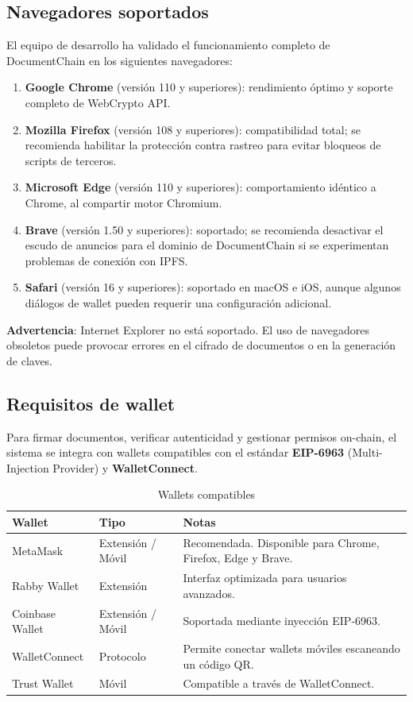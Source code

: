 \documentclass[11pt, a4paper]{article}
\begin{document}
\subsection{Navegadores soportados}

El equipo de desarrollo ha validado el funcionamiento completo de DocumentChain en los siguientes navegadores:

\begin{enumerate}
    \item \textbf{Google Chrome} (versi\'{o}n 110 y superiores): rendimiento \'{o}ptimo y soporte completo de WebCrypto API.
    \item \textbf{Mozilla Firefox} (versi\'{o}n 108 y superiores): compatibilidad total; se recomienda habilitar la protecci\'{o}n contra rastreo para evitar bloqueos de scripts de terceros.
    \item \textbf{Microsoft Edge} (versi\'{o}n 110 y superiores): comportamiento id\'{e}ntico a Chrome, al compartir motor Chromium.
    \item \textbf{Brave} (versi\'{o}n 1.50 y superiores): soportado; se recomienda desactivar el escudo de anuncios para el dominio de DocumentChain si se experimentan problemas de conexi\'{o}n con IPFS.
    \item \textbf{Safari} (versi\'{o}n 16 y superiores): soportado en macOS e iOS, aunque algunos di\'{a}logos de wallet pueden requerir una configuraci\'{o}n adicional.
\end{enumerate}

\textbf{Advertencia}: Internet Explorer no est\'{a} soportado. El uso de navegadores obsoletos puede provocar errores en el cifrado de documentos o en la generaci\'{o}n de claves.

\subsection{Requisitos de wallet}

Para firmar documentos, verificar autenticidad y gestionar permisos on-chain, el sistema se integra con wallets compatibles con el est\'{a}ndar \textbf{EIP-6963} (Multi-Injection Provider) y \textbf{WalletConnect}.

\begin{table}[H]
\centering
\caption{Wallets compatibles}
\label{tab:wallets}
\begin{tabular}{@{}llp{7cm}@{}}
\toprule
\textbf{Wallet} & \textbf{Tipo} & \textbf{Notas} \\
\midrule
MetaMask & Extensi\'{o}n / M\'{o}vil & Recomendada. Disponible para Chrome, Firefox, Edge y Brave. \\
Rabby Wallet & Extensi\'{o}n & Interfaz optimizada para usuarios avanzados. \\
Coinbase Wallet & Extensi\'{o}n / M\'{o}vil & Soportada mediante inyecci\'{o}n EIP-6963. \\
WalletConnect & Protocolo & Permite conectar wallets m\'{o}viles escaneando un c\'{o}digo QR. \\
Trust Wallet & M\'{o}vil & Compatible a trav\'{e}s de WalletConnect. \\
\bottomrule
\end{tabular}
\end{table}
\end{document}
